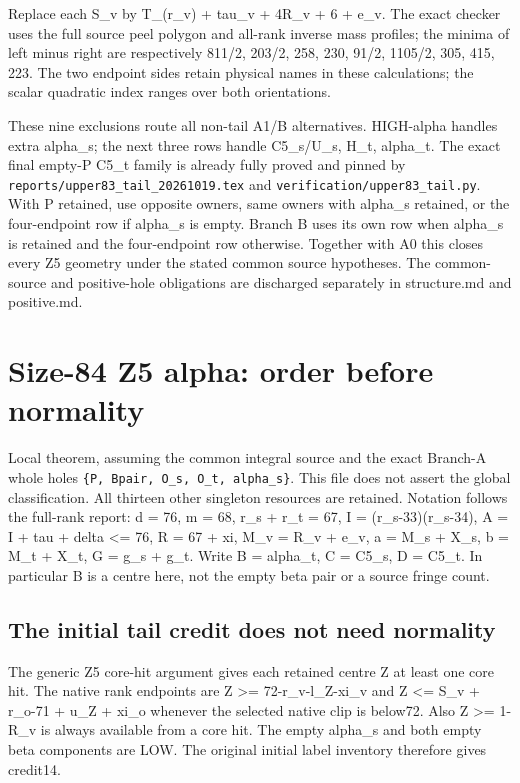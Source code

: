 \documentclass[11pt,a4paper]{article}
\begin{document}
Replace each S\_v by T\_(r\_v) + tau\_v + 4R\_v + 6 + e\_v. The exact
checker uses the full source peel polygon and all-rank inverse mass
profiles; the minima of left minus right are respectively 811/2, 203/2,
258, 230, 91/2, 1105/2, 305, 415, 223. The two endpoint sides retain
physical names in these calculations; the scalar quadratic index ranges
over both orientations.

These nine exclusions route all non-tail A1/B alternatives. HIGH-alpha
handles extra alpha\_s; the next three rows handle C5\_s/U\_s, H\_t,
alpha\_t. The exact final empty-P C5\_t family is already fully proved
and pinned by \texttt{reports/upper83\_tail\_20261019.tex} and
\texttt{verification/upper83\_tail.py}. With P retained, use opposite
owners, same owners with alpha\_s retained, or the four-endpoint row if
alpha\_s is empty. Branch B uses its own row when alpha\_s is retained
and the four-endpoint row otherwise. Together with A0 this closes every
Z5 geometry under the stated common source hypotheses. The common-source
and positive-hole obligations are discharged separately in structure.md
and positive.md.

\clearpage
\hypertarget{size-84-z5-alpha-order-before-normality}{%
\section{Size-84 Z5 alpha: order before
normality}\label{size-84-z5-alpha-order-before-normality}}

Local theorem, assuming the common integral source and the exact
Branch-A whole holes \texttt{\{P,\ Bpair,\ O\_s,\ O\_t,\ alpha\_s\}}.
This file does not assert the global classification. All thirteen other
singleton resources are retained. Notation follows the full-rank report:
d = 76, m = 68, r\_s + r\_t = 67, I = (r\_s-33)(r\_s-34), A = I + tau +
delta \textless= 76, R = 67 + xi, M\_v = R\_v + e\_v, a = M\_s + X\_s, b
= M\_t + X\_t, G = g\_s + g\_t. Write B = alpha\_t, C = C5\_s, D =
C5\_t. In particular B is a centre here, not the empty beta pair or a
source fringe count.

\hypertarget{the-initial-tail-credit-does-not-need-normality}{%
\subsection{The initial tail credit does not need
normality}\label{the-initial-tail-credit-does-not-need-normality}}

The generic Z5 core-hit argument gives each retained centre Z at least
one core hit. The native rank endpoints are Z \textgreater=
72-r\_v-l\_Z-xi\_v and Z \textless= S\_v + r\_o-71 + u\_Z + xi\_o
whenever the selected native clip is below72. Also Z \textgreater=
1-R\_v is always available from a core hit. The empty alpha\_s and both
empty beta components are LOW. The original initial label inventory
therefore gives credit14.
\end{document}
